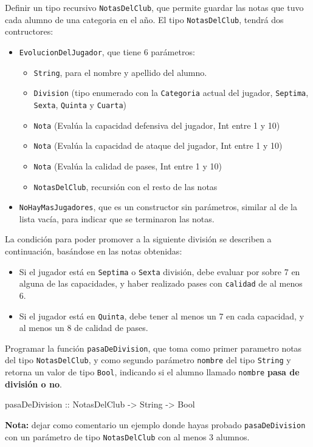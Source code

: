 \documentclass{article}
\begin{document}
\begin{problem}{1}
    Definir un tipo recursivo \texttt{NotasDelClub}, que permite guardar las notas que tuvo cada alumno de una categoria en el año. El tipo \texttt{NotasDelClub}, tendrá dos contructores:
    \begin{itemize}
        \item \texttt{EvolucionDelJugador}, que tiene 6 parámetros:
            \begin{itemize}
                \item \texttt{String}, para el nombre y apellido del alumno.
                \item \texttt{Division} (tipo enumerado con la \texttt{Categoria} actual del jugador, \texttt{Septima}, \texttt{Sexta}, \texttt{Quinta} y \texttt{Cuarta})
                \item \texttt{Nota} (Evalúa la capacidad defensiva del jugador, Int entre 1 y 10)
                \item \texttt{Nota} (Evalúa la capacidad de ataque del jugador, Int entre 1 y 10)
                \item \texttt{Nota} (Evalúa la calidad de pases, Int entre 1 y 10)
                \item \texttt{NotasDelClub}, recursión con el resto de las notas
            \end{itemize}
        \item \texttt{NoHayMasJugadores}, que es un constructor sin parámetros, similar al de la lista vacía, para indicar que se terminaron las notas. 
    \end{itemize}
\end{problem}

\begin{problem}{2}
    La condición para poder promover a la siguiente división se describen a continuación, basándose en las notas obtenidas:
    \begin{itemize}
        \item Si el jugador está en \texttt{Septima} o \texttt{Sexta} división, debe evaluar por sobre 7 en alguna de las capacidades, y haber realizado pases con \texttt{calidad} de al menos 6.
        \item Si el jugador está en \texttt{Quinta}, debe tener al menos un 7 en cada capacidad, y al menos un 8 de calidad de pases.
    \end{itemize}
    Programar la función \texttt{pasaDeDivision}, que toma como primer parametro notas del tipo \texttt{NotasDelClub}, y como segundo parámetro \texttt{nombre} del tipo \texttt{String} y retorna un valor de tipo \texttt{Bool}, indicando si el alumno llamado \texttt{nombre} \textbf{pasa de división o no}.
    \begin{haskell}
        pasaDeDivision :: NotasDelClub -> String -> Bool
    \end{haskell}
    \textbf{Nota:} dejar como comentario un ejemplo donde hayas probado \texttt{pasaDeDivision} con un parámetro de tipo \texttt{NotasDelClub} con al menos 3 alumnos.
\end{problem}
\end{document}
